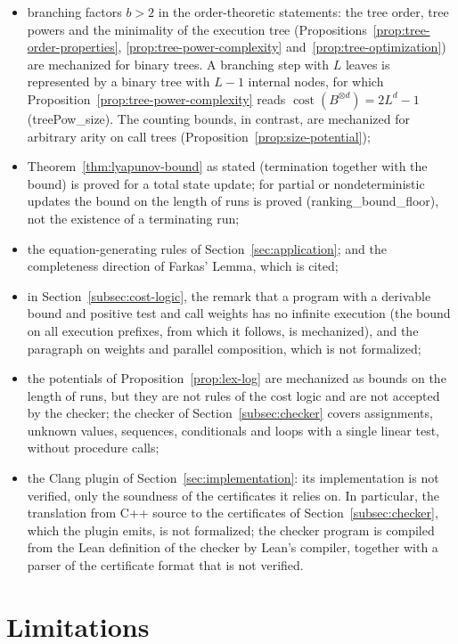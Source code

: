 \documentclass[oneside,english]{amsart}
\numberwithin{equation}{section}
\numberwithin{figure}{section}
\theoremstyle{plain}
\theoremstyle{definition}
\theoremstyle{plain}
\theoremstyle{remark}
\theoremstyle{plain}
\theoremstyle{definition}
\theoremstyle{plain}
\theoremstyle{remark}
\DeclareMathOperator{\cost}{cost}
\newcommand{\lean}[1]{{\ttfamily\small #1}}
\begin{document}
\begin{itemize}
    \item branching factors $b > 2$ in the order-theoretic statements: the tree order, tree powers and the minimality of the execution tree (Propositions~\ref{prop:tree-order-properties}, \ref{prop:tree-power-complexity} and~\ref{prop:tree-optimization}) are mechanized for binary trees. A branching step with $L$ leaves is represented by a binary tree with $L - 1$ internal nodes, for which Proposition~\ref{prop:tree-power-complexity} reads $\cost(B^{\otimes d}) = 2L^d - 1$ (\lean{treePow\_\allowbreak size}). The counting bounds, in contrast, are mechanized for arbitrary arity on call trees (Proposition~\ref{prop:size-potential});
    \item Theorem~\ref{thm:lyapunov-bound} as stated (termination together with the bound) is proved for a total state update; for partial or nondeterministic updates the bound on the length of runs is proved (\lean{ranking\_\allowbreak bound\_\allowbreak floor}), not the existence of a terminating run;
    \item the equation-generating rules of Section~\ref{sec:application}; and the completeness direction of Farkas' Lemma, which is cited;
    \item in Section~\ref{subsec:cost-logic}, the remark that a program with a derivable bound and positive test and call weights has no infinite execution (the bound on all execution prefixes, from which it follows, is mechanized), and the paragraph on weights and parallel composition, which is not formalized;
    \item the potentials of Proposition~\ref{prop:lex-log} are mechanized as bounds on the length of runs, but they are not rules of the cost logic and are not accepted by the checker; the checker of Section~\ref{subsec:checker} covers assignments, unknown values, sequences, conditionals and loops with a single linear test, without procedure calls;
    \item the Clang plugin of Section~\ref{sec:implementation}: its implementation is not verified, only the soundness of the certificates it relies on. In particular, the translation from C++ source to the certificates of Section~\ref{subsec:checker}, which the plugin emits, is not formalized; the checker program is compiled from the Lean definition of the checker by Lean's compiler, together with a parser of the certificate format that is not verified.
\end{itemize}

\section{Limitations}
\label{sec:limitations}
\end{document}
